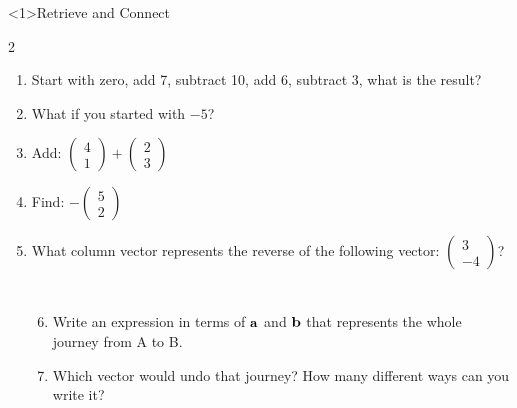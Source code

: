 \documentclass{beamer}
\newcommand{\ashow}[1]{\uncover<2->{\textcolor{red}{\small #1}}}
\begin{document}
\begin{frame}<1>{Retrieve and Connect}

\begin{multicols}{2}
\begin{enumerate}
  \item Start with zero, add 7, subtract 10, add 6, subtract 3, what is the result? \ashow{0}
  \item What if you started with $-5$? \ashow{$-5$}
  \item Add:
  $\begin{pmatrix}4\\1\end{pmatrix}
  +
  \begin{pmatrix}2\\3\end{pmatrix}$ \ashow{\(\binom{6}{4}\)}
  \item Find:
  $-\begin{pmatrix}5\\2\end{pmatrix}$ \ashow{\(\binom{-5}{-2}\)}
  \item What column vector represents the reverse of the following vector:
  $\begin{pmatrix}3\\-4\end{pmatrix}$? \ashow{\(\binom{-3}{4}\)}
\end{enumerate}
\end{multicols}

\vspace{0.3cm}



\begin{columns}[T]

\begin{center}
\end{center}


\begin{enumerate}
    \setcounter{enumi}{5}
  \item Write an expression in terms of $\bf{a}$ and $\bf{b}$ that represents the whole journey from A to B. \ashow{\(\mathbf{a}+\mathbf{b}\)}
  \item Which vector would undo that journey? How many different ways can you write it? \ashow{\(\overrightarrow{BA} = -(\mathbf{a}+\mathbf{b}) = -\mathbf{a}-\mathbf{b}\)}
\end{enumerate}

\end{columns}

\end{frame}

\end{document}
